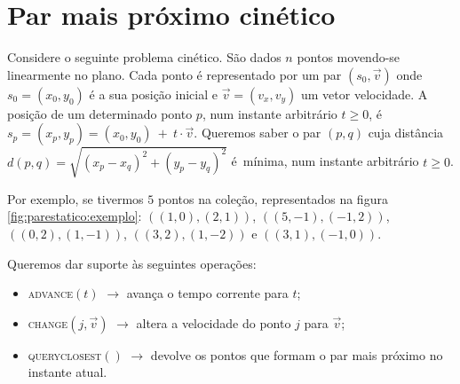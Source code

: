 \chapter{Par mais próximo cinético}

Considere o seguinte problema cinético. São dados $n$ pontos
movendo-se linearmente no plano. Cada ponto é representado por um
par $(s_0, \vec{v})$ onde $s_0 = (x_0, y_0)$ é a sua posição inicial
e $\vec{v} = (v_x, v_y)$ um vetor velocidade. A posição de um
determinado ponto $p$, num instante arbitrário $t \geq 0$, é $s_p =
(x_p, y_p) = (x_0, y_0)~+~t\cdot \vec{v}$. Queremos saber o par $(p,
q)$ cuja distância $d(p, q) = \sqrt{(x_p - x_q)^2 + (y_p - y_q)^2}$
é~mínima, num instante arbitrário $t \geq 0$.

Por exemplo, se tivermos $5$ pontos na coleção, representados na
figura \ref{fig:parestatico:exemplo}: $((1, 0), (2, 1))$, $((5, -1),
(-1, 2))$, $((0, 2), (1, -1))$, $((3, 2), (1, -2))$ e $((3, 1), (-1,
0))$.



Queremos dar suporte às seguintes operações:
\begin{itemize}
    \item \textsc{advance}$(t)$ $\rightarrow$ avança o tempo corrente
    para $t$;
    \item \textsc{change}$(j, \vec{v})$ $\rightarrow$ altera a
    velocidade do ponto $j$ para $\vec{v}$;
    \item \textsc{query\textunderscore closest}$()$ $\rightarrow$
    devolve os pontos que formam o par mais próximo no instante
    atual.
\end{itemize}



